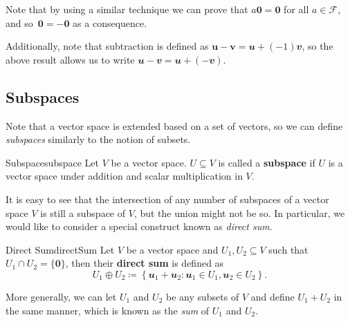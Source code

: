 \documentclass[math, code]{amznotes}
\theoremstyle{remark}
\newcommand{\zero}{\mathbf{0}}
\begin{document}
Note that by using a similar technique we can prove that $a\zero = \zero$ for all $a \in \mathcal{F}$, and so~$\zero = -\zero$ as a consequence.

Additionally, note that subtraction is defined as $\mathbf{u - v} = \mathbfit{u} + (-1)\mathbfit{v}$, so the above result allows us to write $\mathbfit{u - v} = \mathbfit{u} + (-\mathbfit{v})$.

\subsection{Subspaces}
Note that a vector space is extended based on a set of vectors, so we can define \textit{subspaces} similarly to the notion of subsets.
\begin{dfnbox}{Subspace}{subspace}
    Let $V$ be a vector space. $U \subseteq V$ is called a {\color{red} \textbf{subspace}} if $U$ is a vector space under addition and scalar multiplication in $V$.
\end{dfnbox}
It is easy to see that the intersection of any number of subspaces of a vector space $V$ is still a subspace of $V$, but the union might not be so. In particular, we would like to consider a special construct known as \textit{direct sum}.
\begin{dfnbox}{Direct Sum}{directSum}
    Let $V$ be a vector space and $U_1, U_2 \subseteq V$ such that $U_1 \cap U_2 = \{\zero\}$, then their {\color{red} \textbf{direct sum}} is defined as
    \begin{equation*}
        U_1 \oplus U_2 \coloneqq \left\{\mathbfit{u}_1 + \mathbfit{u}_2 \colon \mathbfit{u}_1 \in U_1, \mathbfit{u}_2 \in U_2\right\}.
    \end{equation*}
\end{dfnbox}
More generally, we can let $U_1$ and $U_2$ be any subsets of $V$ and define $U_1 + U_2$ in the same manner, which is known as the \textit{sum} of $U_1$ and $U_2$.
\end{document}
